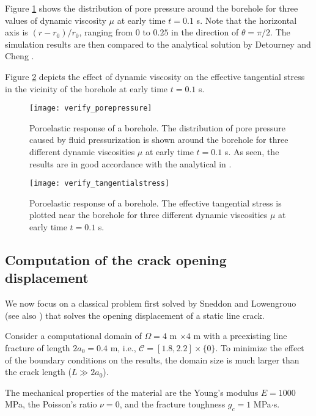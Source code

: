 Figure \ref{Fig:Borehole_porepressure} shows the distribution
of pore pressure around the borehole for three values of dynamic viscosity $\mu$ at early time $t=0.1$ s. Note that the horizontal axis is $(r-r_0)/r_0$, ranging from $0$ to $0.25$ in the direction of $\theta= \pi/2$. The simulation results are then compared to the analytical solution by Detourney and Cheng \cite{detournay1988poroelastic}.

Figure \ref{Fig:Borehole_tangential_stress} depicts the effect of dynamic viscosity on the effective tangential stress in the vicinity of the borehole at early time $t=0.1$ s.%

\begin{figure}[htbp]
    \centering
    \texttt{[image: verify\_porepressure]}
    \caption{Poroelastic response of a borehole. The distribution of pore pressure caused by fluid pressurization is shown around the borehole for three different dynamic viscosities $\mu$ at early time $t= 0.1$ s. As seen, the results are in good accordance with the analytical in \cite{detournay1988poroelastic}.}
    \label{Fig:Borehole_porepressure}
\end{figure}

\begin{figure}[htbp]
    \centering
    \texttt{[image: verify\_tangentialstress]}
    \caption{Poroelastic response of a borehole. The effective tangential stress is plotted near the borehole for three different dynamic viscosities $\mu$ at early time $t=0.1$ s.}
    \label{Fig:Borehole_tangential_stress}
\end{figure}

\subsection{Computation of the crack opening displacement}
We now focus on a classical problem first solved by Sneddon and Lowengrouo \cite{SneddonLowengrub69} (see also \cite{bourdin2012variational}) that solves the opening displacement of a static line crack.

Consider a computational domain of $\Omega=4$ m $\times 4$ m with a preexisting line fracture of length $2a_0=0.4$ m, i.e., $\mathcal{C}=[1.8, 2.2]\times\{0\}$. To minimize the effect of the boundary conditions on the results, the domain size is much larger than the crack length ($L\gg 2a_0$).

The mechanical properties of the material are the Young's modulus $E=1000$ MPa, the Poisson's ratio $\nu=0$, and the fracture toughness $g_c=1$ MPa$\cdot$s.

